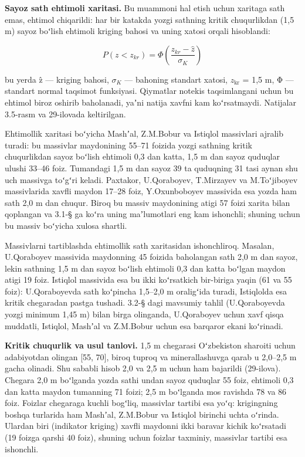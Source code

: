 \textbf{Sayoz sath ehtimoli xaritasi.} Bu muammoni hal etish uchun
xaritaga sath emas, ehtimol chiqarildi: har bir katakda yozgi sathning
kritik chuqurlikdan (1,5 m) sayoz boʻlish ehtimoli kriging bahosi va
uning xatosi orqali hisoblandi:

\begin{equation}\tag{3.1}
P(z < z_{kr}) = \Phi\left(\frac{z_{kr} - \hat z}{\sigma_K}\right)
\end{equation}

bu yerda ẑ --- kriging bahosi, \(\sigma_{K}\) --- bahoning standart
xatosi, \(z_{\mathrm{kr}}\) = 1,5 m, Φ --- standart normal taqsimot
funksiyasi. Qiymatlar notekis taqsimlangani uchun bu ehtimol biroz
oshirib baholanadi, yaʼni natija xavfni kam koʻrsatmaydi. Natijalar
3.5-rasm va 29-ilovada keltirilgan.



Ehtimollik xaritasi boʻyicha Mashʼal, Z.M.Bobur va Istiqlol massivlari
ajralib turadi: bu massivlar maydonining 55--71 foizida yozgi sathning
kritik chuqurlikdan sayoz boʻlish ehtimoli 0,3 dan katta, 1,5 m dan
sayoz quduqlar ulushi 33--46 foiz. Tumandagi 1,5 m dan sayoz 39 ta
quduqning 31 tasi aynan shu uch massivga toʻgʻri keladi. Paxtakor,
U.Qoraboyev, T.Mirzayev va M.Toʻjiboyev massivlarida xavfli maydon
17--28 foiz, Y.Oxunboboyev massivida esa yozda ham sath 2,0 m dan
chuqur. Biroq bu massiv maydonining atigi 57 foizi xarita bilan
qoplangan va 3.1-§ ga koʻra uning maʼlumotlari eng kam ishonchli;
shuning uchun bu massiv boʻyicha xulosa shartli.

Massivlarni tartiblashda ehtimollik sath xaritasidan ishonchliroq.
Masalan, U.Qoraboyev massivida maydonning 45 foizida baholangan sath 2,0
m dan sayoz, lekin sathning 1,5 m dan sayoz boʻlish ehtimoli 0,3 dan
katta boʻlgan maydon atigi 19 foiz. Istiqlol massivida esa bu ikki
koʻrsatkich bir-biriga yaqin (61 va 55 foiz): U.Qoraboyevda sath
koʻpincha 1,5--2,0 m oraligʻida turadi, Istiqlolda esa kritik chegaradan
pastga tushadi. 3.2-§ dagi mavsumiy tahlil (U.Qoraboyevda yozgi minimum
1,45 m) bilan birga olinganda, U.Qoraboyev uchun xavf qisqa muddatli,
Istiqlol, Mashʼal va Z.M.Bobur uchun esa barqaror ekani koʻrinadi.

\textbf{Kritik chuqurlik va usul tanlovi.} 1,5 m chegarasi Oʻzbekiston
sharoiti uchun adabiyotdan olingan {[}55, 70{]}, biroq tuproq va
minerallashuvga qarab u 2,0--2,5 m gacha olinadi. Shu sababli hisob 2,0
va 2,5 m uchun ham bajarildi (29-ilova). Chegara 2,0 m boʻlganda yozda
sathi undan sayoz quduqlar 55 foiz, ehtimoli 0,3 dan katta maydon
tumanning 71 foizi; 2,5 m boʻlganda mos ravishda 78 va 86 foiz. Foizlar
chegaraga kuchli bogʻliq, massivlar tartibi esa yoʻq: krigingning boshqa
turlarida ham Mashʼal, Z.M.Bobur va Istiqlol birinchi uchta oʻrinda.
Ulardan biri (indikator kriging) xavfli maydonni ikki baravar kichik
koʻrsatadi (19 foizga qarshi 40 foiz), shuning uchun foizlar taxminiy,
massivlar tartibi esa ishonchli.

